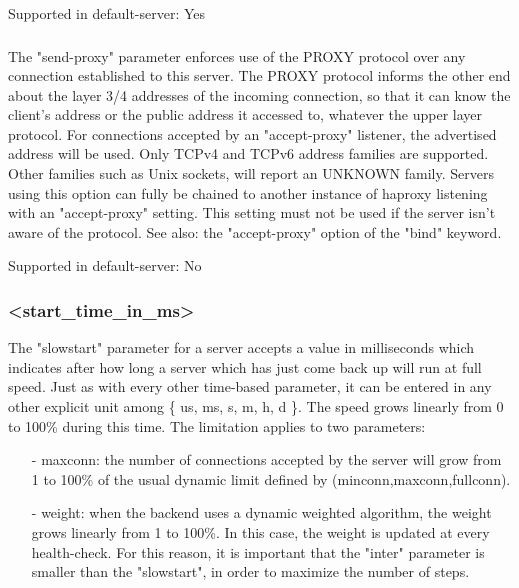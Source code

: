   Supported in default-server: Yes

\subsubsection[send-proxy]{}
  The "send-proxy" parameter enforces use of the PROXY protocol over any
  connection established to this server. The PROXY protocol informs the other
  end about the layer 3/4 addresses of the incoming connection, so that it can
  know the client's address or the public address it accessed to, whatever the
  upper layer protocol. For connections accepted by an "accept-proxy" listener,
  the advertised address will be used. Only TCPv4 and TCPv6 address families
  are supported. Other families such as Unix sockets, will report an UNKNOWN
  family. Servers using this option can fully be chained to another instance of
  haproxy listening with an "accept-proxy" setting. This setting must not be
  used if the server isn't aware of the protocol. See also: the "accept-proxy"
  option of the "bind" keyword.

  Supported in default-server: No

\subsubsection[slowstart]{ <start\_time\_in\_ms>}
  The "slowstart" parameter for a server accepts a value in milliseconds which
  indicates after how long a server which has just come back up will run at
  full speed. Just as with every other time-based parameter, it can be entered
  in any other explicit unit among \{ us, ms, s, m, h, d \}. The speed grows
  linearly from 0 to 100\% during this time. The limitation applies to two
  parameters:

  \begin{itemize}
  \item[-] maxconn: the number of connections accepted by the server will grow from 1
    to 100\% of the usual dynamic limit defined by (minconn,maxconn,fullconn).

  \item[-] weight: when the backend uses a dynamic weighted algorithm, the weight
    grows linearly from 1 to 100\%. In this case, the weight is updated at every
    health-check. For this reason, it is important that the "inter" parameter
    is smaller than the "slowstart", in order to maximize the number of steps.
  \end{itemize}

